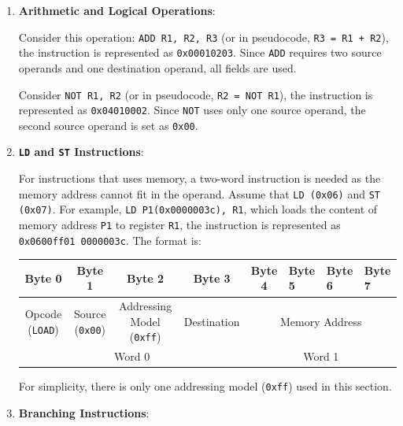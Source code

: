 \begin{enumerate}

\item \textbf{Arithmetic and Logical Operations}:

Consider this operation: \texttt{ADD R1, R2, R3} (or in pseudocode, \texttt{R3 = R1 + R2}),
the instruction is represented as \texttt{0x00010203}. Since \texttt{ADD} requires two source
operands and one destination operand, all fields are used.

Consider \texttt{NOT R1, R2} (or in pseudocode, \texttt{R2 = NOT R1}), the instruction is
represented as \texttt{0x04010002}. Since \texttt{NOT} uses only one source operand, the
second source operand is set as \texttt{0x00}.

\item \textbf{\texttt{LD} and \texttt{ST} Instructions}:

For instructions that uses memory, a two-word instruction is needed as the memory address
cannot fit in the operand. Assume that \texttt{LD (0x06)} and \texttt{ST (0x07)}.
For example, \texttt{LD P1(0x0000003c), R1}, which loads the content of
memory address \texttt{P1} to register \texttt{R1}, the instruction is represented as
\texttt{0x0600ff01 0000003c}. The format is:
\begin{table}[H]
    \centering
    \begin{tabular}{ccccclll}
    Byte 0                       & Byte 1                                     & Byte 2                                      & Byte 3                                   & Byte 4    & Byte 5    & Byte 6    & Byte 7   \\ \hline
    \multicolumn{1}{|c|}{Opcode (\texttt{LOAD})} & \multicolumn{1}{c|}{Source (\texttt{0x00})} & \multicolumn{1}{c|}{Addressing Model (\texttt{0xff})} & \multicolumn{1}{c|}{Destination} & \multicolumn{4}{c|}{Memory Address} \\ \hline
    \multicolumn{4}{c}{Word 0}                                                                                                                                         & \multicolumn{4}{c}{Word 1}                  
    \end{tabular}
\end{table}

\begin{remark}
    For simplicity, there is only one addressing model (\texttt{0xff}) used in this section.
\end{remark}

\item \textbf{Branching Instructions}:


\end{enumerate}
